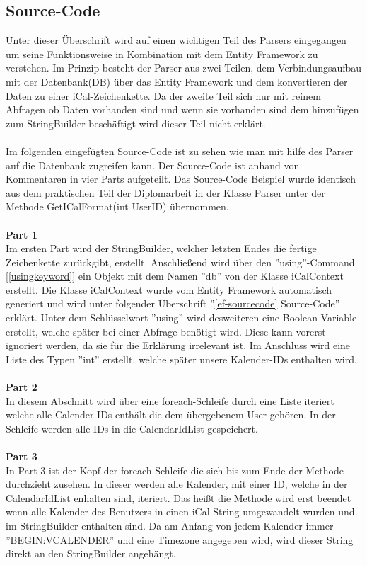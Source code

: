 \subsection{Source-Code}
\label{sec:parser-sourcecode}
Unter dieser Überschrift wird auf einen wichtigen Teil des Parsers eingegangen um seine Funktionsweise in Kombination mit dem Entity Framework zu verstehen. Im Prinzip besteht der Parser aus zwei Teilen, dem Verbindungsaufbau mit der Datenbank(DB) über das Entity Framework und dem konvertieren der Daten zu einer iCal-Zeichenkette. Da der zweite Teil sich nur mit reinem Abfragen ob Daten vorhanden sind und wenn sie vorhanden sind dem hinzufügen zum StringBuilder beschäftigt wird dieser Teil nicht erklärt.\\ \\
Im folgenden eingefügten Source-Code ist zu sehen wie man mit hilfe des Parser auf die Datenbank zugreifen kann. Der Source-Code ist anhand von Kommentaren in vier Parts aufgeteilt. Das Source-Code Beispiel wurde identisch aus dem praktischen Teil der Diplomarbeit in der Klasse Parser unter der Methode GetICalFormat(int UserID) übernommen. \\ \\
\textbf{Part 1} \\
Im ersten Part wird der StringBuilder, welcher letzten Endes die fertige Zeichenkette zurückgibt, erstellt. Anschließend wird über den ''using''-Command [\ref{usingkeyword}] ein Objekt mit dem Namen ''db'' von der Klasse iCalContext erstellt. Die Klasse iCalContext wurde vom Entity Framework automatisch generiert und wird unter folgender Überschrift ''\ref{ef-sourcecode} Source-Code'' erklärt. Unter dem Schlüsselwort ''using'' wird desweiteren eine Boolean-Variable erstellt, welche später bei einer Abfrage benötigt wird. Diese kann vorerst ignoriert werden, da sie für die Erklärung irrelevant ist. Im Anschluss wird eine Liste des Typen ''int'' erstellt, welche später unsere Kalender-IDs enthalten wird. \\ \\
\textbf{Part 2} \\
In diesem Abschnitt wird über eine foreach-Schleife durch eine Liste iteriert welche alle Calender IDs enthält die dem übergebenem User gehören. In der Schleife werden alle IDs in die CalendarIdList gespeichert. \\ \\
\textbf{Part 3} \\
In Part 3 ist der Kopf der foreach-Schleife die sich bis zum Ende der Methode durchzieht zusehen. In dieser werden alle Kalender, mit einer ID, welche in der CalendarIdList enhalten sind, iteriert. Das heißt die Methode wird erst beendet wenn alle Kalender des Benutzers in einen iCal-String umgewandelt wurden und im StringBuilder enthalten sind. Da am Anfang von jedem Kalender immer ''BEGIN:VCALENDER'' und eine Timezone angegeben wird, wird dieser String direkt an den StringBuilder angehängt. \\ \\
